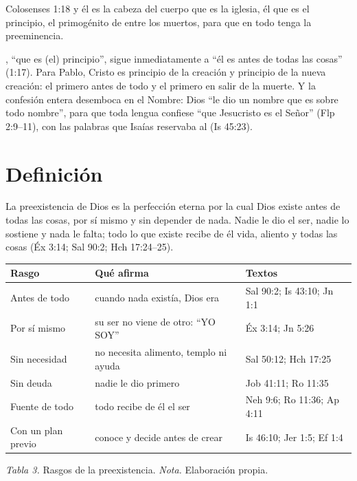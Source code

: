 \begin{verso}{Colosenses 1:18}
y él es la cabeza del cuerpo que es la iglesia, él que es el principio, el primogénito de entre los muertos, para que en todo tenga la preeminencia.
\end{verso}

, ``que es (el) principio'', sigue inmediatamente a ``él es antes de todas las cosas'' (1:17). Para Pablo, Cristo es principio de la creación y principio de la nueva creación: el primero antes de todo y el primero en salir de la muerte. Y la confesión entera desemboca en el Nombre: Dios ``le dio un nombre que es sobre todo nombre'', para que toda lengua confiese ``que Jesucristo es el Señor'' (Flp 2:9--11), con las palabras que Isaías reservaba al \SENOR{} (Is 45:23).

\section{Definición}

\begin{tcolorbox}[colback=papiro,colframe=azul,boxrule=1pt,arc=3pt,fonttitle=\bfseries,title=Definición]
La preexistencia de Dios es la perfección eterna por la cual Dios existe antes de todas las cosas, por sí mismo y sin depender de nada. Nadie le dio el ser, nadie lo sostiene y nada le falta; todo lo que existe recibe de él vida, aliento y todas las cosas (Éx 3:14; Sal 90:2; Hch 17:24--25).
\end{tcolorbox}

\begin{center}\small\renewcommand{\arraystretch}{1.2}
\begin{tabular}{@{}L{3.4cm}L{6.6cm}L{4.4cm}@{}}
\toprule
\textbf{Rasgo} & \textbf{Qué afirma} & \textbf{Textos} \\ \midrule
Antes de todo & cuando nada existía, Dios era & Sal 90:2; Is 43:10; Jn 1:1 \\
Por sí mismo & su ser no viene de otro: ``YO SOY'' & Éx 3:14; Jn 5:26 \\
Sin necesidad & no necesita alimento, templo ni ayuda & Sal 50:12; Hch 17:25 \\
Sin deuda & nadie le dio primero & Job 41:11; Ro 11:35 \\
Fuente de todo & todo recibe de él el ser & Neh 9:6; Ro 11:36; Ap 4:11 \\
Con un plan previo & conoce y decide antes de crear & Is 46:10; Jer 1:5; Ef 1:4 \\
\bottomrule
\end{tabular}\par
{\footnotesize\color{gris}\textit{Tabla 3.} Rasgos de la preexistencia. \textit{Nota.} Elaboración propia.}
\end{center}

